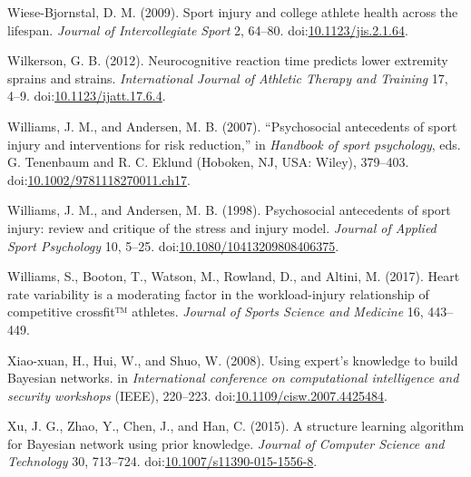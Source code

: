 \documentclass[utf8]{frontiersHLTH}
\begin{document}
\leavevmode\hypertarget{ref-Wiese-Bjornstal2009}{}%
Wiese-Bjornstal, D. M. (2009). Sport injury and college athlete health
across the lifespan. \emph{Journal of Intercollegiate Sport} 2, 64--80.
doi:\href{https://doi.org/10.1123/jis.2.1.64}{10.1123/jis.2.1.64}.

\leavevmode\hypertarget{ref-Wilkerson2012a}{}%
Wilkerson, G. B. (2012). Neurocognitive reaction time predicts lower
extremity sprains and strains. \emph{International Journal of Athletic
Therapy and Training} 17, 4--9.
doi:\href{https://doi.org/10.1123/ijatt.17.6.4}{10.1123/ijatt.17.6.4}.

\leavevmode\hypertarget{ref-Williams2007}{}%
Williams, J. M., and Andersen, M. B. (2007). ``Psychosocial antecedents
of sport injury and interventions for risk reduction,'' in
\emph{Handbook of sport psychology}, eds. G. Tenenbaum and R. C. Eklund
(Hoboken, NJ, USA: Wiley), 379--403.
doi:\href{https://doi.org/10.1002/9781118270011.ch17}{10.1002/9781118270011.ch17}.

\leavevmode\hypertarget{ref-Williams1998}{}%
Williams, J. M., and Andersen, M. B. (1998). Psychosocial antecedents of
sport injury: review and critique of the stress and injury model.
\emph{Journal of Applied Sport Psychology} 10, 5--25.
doi:\href{https://doi.org/10.1080/10413209808406375}{10.1080/10413209808406375}.

\leavevmode\hypertarget{ref-Williams2017}{}%
Williams, S., Booton, T., Watson, M., Rowland, D., and Altini, M.
(2017). Heart rate variability is a moderating factor in the
workload-injury relationship of competitive crossfit™ athletes.
\emph{Journal of Sports Science and Medicine} 16, 443--449.

\leavevmode\hypertarget{ref-Xiao-xuan2007}{}%
Xiao-xuan, H., Hui, W., and Shuo, W. (2008). Using expert's knowledge to
build Bayesian networks. in \emph{International conference on
computational intelligence and security workshops} (IEEE), 220--223.
doi:\href{https://doi.org/10.1109/cisw.2007.4425484}{10.1109/cisw.2007.4425484}.

\leavevmode\hypertarget{ref-Xu2015}{}%
Xu, J. G., Zhao, Y., Chen, J., and Han, C. (2015). A structure learning
algorithm for Bayesian network using prior knowledge. \emph{Journal of
Computer Science and Technology} 30, 713--724.
doi:\href{https://doi.org/10.1007/s11390-015-1556-8}{10.1007/s11390-015-1556-8}.
\end{document}
